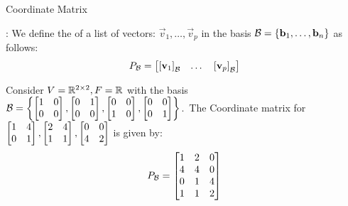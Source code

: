 \documentclass[xcoler=dvipsnames, aspectratio=169]{beamer}
\newcommand{\B}{\mathcal{B}}
\begin{document}
    \begin{frame}{Coordinate Matrix}
        \small
        \begin{defn}
            : We define the  of a list of
            vectors: $\vec{v}_1,\dots,\vec{v}_p$ in the basis $\B=\setBasic{\vec{b}_1,\dots,\vec{b}_n}$
            as follows:
            \[
                P_\B = \bMat{\bCoord{\vec{v}_1}{\B} & \dots & \bCoord{\vec{v}_p}{\B}}
            \]
        \end{defn}\pause
        \begin{example}
            Consider $V=\mathbb{R}^{2\times 2},F=\mathbb{R}$ with the basis 
            $\B=\setBasic{\bMat{1&0\\0&0},\bMat{0&1\\0&0},\bMat{0&0\\1&0},\bMat{0&0\\0&1}}$.\pause\ 
            The Coordinate matrix for $\begin{bmatrix}1&4\\0&1\end{bmatrix},\begin{bmatrix}2&4\\1&1\end{bmatrix},\begin{bmatrix}0&0\\4&2\end{bmatrix}$ is given by:\pause\
            \[
                P_\B = \bMat{
                    1 & 2 & 0\\
                    4 & 4 & 0\\
                    0 & 1 & 4\\
                    1 & 1 & 2
                }
            \]
        \end{example}
    \end{frame}
\end{document}
